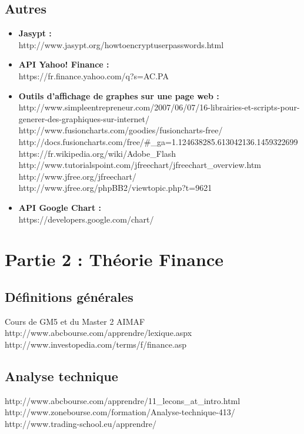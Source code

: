 \subsection{Autres}
\begin{itemize}
 \item \textbf{Jasypt : \\}
    http://www.jasypt.org/howtoencryptuserpasswords.html
 \item \textbf{API Yahoo! Finance : \\}
    https://fr.finance.yahoo.com/q?s=AC.PA
 \item \textbf{Outils d'affichage de graphes sur une page web : \\}   
    http://www.simpleentrepreneur.com/2007/06/07/16-librairies-et-scripts-pour-generer-des-graphiques-sur-internet/ \\
    http://www.fusioncharts.com/goodies/fusioncharts-free/ \\
    http://docs.fusioncharts.com/free/\#\_ga=1.124638285.613042136.1459322699 \\
    https://fr.wikipedia.org/wiki/Adobe\_Flash \\
    http://www.tutorialspoint.com/jfreechart/jfreechart\_overview.htm \\
    http://www.jfree.org/jfreechart/ \\
    http://www.jfree.org/phpBB2/viewtopic.php?t=9621 \\
 \item \textbf{API Google Chart : \\} 
    https://developers.google.com/chart/ \\
\end{itemize}

\section{Partie 2 : Théorie Finance}
\subsection{Définitions générales}
Cours de GM5 et du Master 2 AIMAF \\
\indent http://www.abcbourse.com/apprendre/lexique.aspx\\
\indent http://www.investopedia.com/terms/f/finance.asp

\subsection{Analyse technique}
http://www.abcbourse.com/apprendre/11\_lecons\_at\_intro.html\\
\indent http://www.zonebourse.com/formation/Analyse-technique-413/\\
\indent http://www.trading-school.eu/apprendre/


